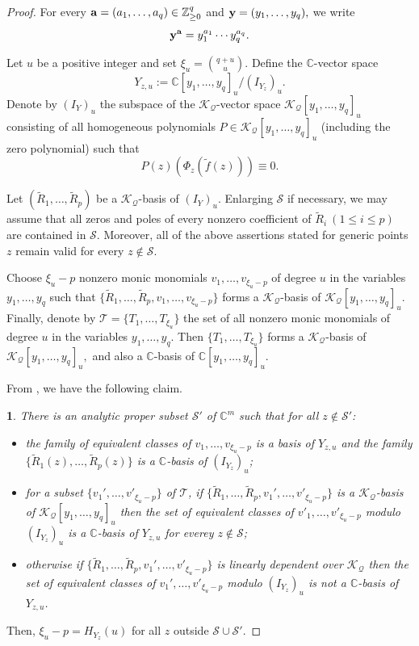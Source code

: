 \documentclass[12pt,leqno]{amsart}
\newtheorem{claim}[equation]{\indent{\it Claim}\rm }
\newcommand{\C}{{\mathbb{C}}}
\numberwithin{equation}{section}
\begin{document}
\begin{proof}
For every ${\bf a}=(a_1,\ldots,a_q)\in\mathbb Z_{\ge0}^q$ and ${\bf y}=(y_1,\ldots,y_q),$
we write
$${\bf y}^{\bf a}=y_1^{a_1}\cdots y_q^{a_q}.$$

Let $u$ be a positive integer and set $\xi_u=\binom{q+u}{u}.$
Define the $\C$-vector space
$$Y_{z,u}:=\C[y_1,\ldots,y_q]_u/(I_{Y_z})_u.$$
Denote by $(I_Y)_u$ the subspace of the $\mathcal K_{\mathcal Q}$-vector space $\mathcal K_{\mathcal Q}[y_1,\ldots,y_q]_u$
consisting of all homogeneous polynomials $P\in\mathcal K_{\mathcal Q}[y_1,\ldots,y_q]_u$ (including the zero polynomial) such that
$$P(z)(\Phi_z(\tilde f(z)))\equiv 0.$$

Let $(\tilde R_1,\ldots,\tilde R_p)$ be a $\mathcal K_{\mathcal Q}$-basis of $(I_Y)_u$. Enlarging $\mathcal S$ if necessary, we may assume that all zeros and poles of every nonzero coefficient of $\tilde R_i\ (1\le i\le p)$ are contained in $\mathcal S$. Moreover, all of the above assertions stated for generic points $z$ remain valid for every $z\notin\mathcal S$.

Choose $\xi_u-p$ nonzero monic monomials $v_1,\ldots,v_{\xi_u-p}$ of degree $u$ in the variables $y_1,\ldots,y_q$ such that $\{\tilde R_1,\ldots,\tilde R_p,v_1,\ldots,v_{\xi_u-p}\}$ forms a $\mathcal K_{\mathcal Q}$-basis of $\mathcal K_{\mathcal Q}[y_1,\ldots,y_q]_u.$ Finally, denote by $\mathcal T=\{T_1,\ldots,T_{\xi_u}\}$ the set of all nonzero monic monomials of degree $u$ in the variables $y_1,\ldots,y_q$. Then $\{T_1,\ldots,T_{\xi_u}\}$ forms a $\mathcal K_{\mathcal Q}$-basis of $\mathcal K_{\mathcal Q}[y_1,\ldots,y_q]_u,$ and also a $\C$-basis of $\C[y_1,\ldots,y_q]_u.$

From \cite[Claim 4.3]{Q22c}, we have the following claim.
\begin{claim}\label{3.1}
There is an analytic proper subset $\mathcal S'$ of $\C^m$ such that for all $z\not\in\mathcal S'$:
\begin{itemize}
\item[(i)] the family of equivalent classes of $v_1,\ldots,v_{\xi_u-p}$ is a basis of $Y_{z,u}$ and the family $\{\tilde R_1(z),\ldots,\tilde R_p(z)\}$ is a $\C$-basis of $(I_{Y_z})_u$;
\item[(ii)] for a subset $\{v_1',\ldots,v'_{\xi_u-p}\}$ of $\mathcal T$, if $\{\tilde R_1,\ldots,\tilde R_p,v_1',\ldots,v'_{\xi_u-p}\}$ is a $\mathcal K_{\mathcal Q}$-basis of $\mathcal K_{\mathcal Q}[y_1,\ldots,y_q]_u$ then the set of equivalent classes of $v'_1,\ldots,v'_{\xi_u-p}$ modulo $(I_{Y_z})_u$ is a $\C$-basis of $Y_{z,u}$ for everey $z\not\in\mathcal S$;
\item[(iii)] otherwise if $\{\tilde R_1,\ldots,\tilde R_p,v_1',\ldots,v'_{\xi_u-p}\}$ is linearly dependent over $\mathcal K_{\mathcal Q}$ then the set of equivalent classes of $v_1',\ldots,v'_{\xi_u-p}$ modulo $(I_{Y_z})_u$ is not a $\C$-basis of $Y_{z,u}$.
\end{itemize}
\end{claim}
\noindent
Then, $\xi_u-p=H_{Y_z}(u)$ for all $z$ outside $\mathcal S\cup\mathcal S'.$ 


\end{proof}
\end{document}
